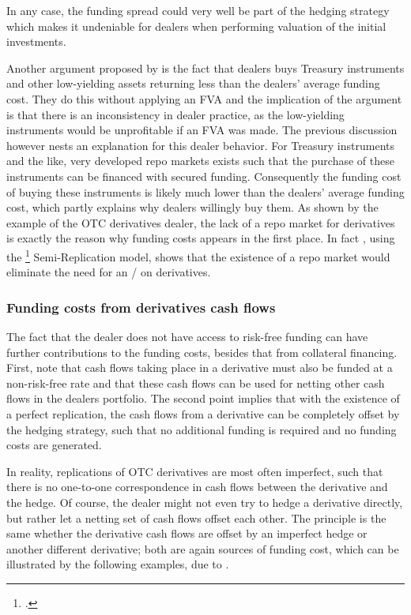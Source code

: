 \documentclass[../../../main.tex]{subfiles}
\begin{document}
        In any case,
        the funding spread could very well be part of the hedging strategy which makes it undeniable for dealers when performing valuation of the initial investments.

        Another argument proposed by \cite{HullWhite2012FVA} is the fact that dealers buys Treasury instruments and other low-yielding assets returning less than the dealers' average funding cost.
        They do this without applying an FVA and the implication of the argument is that there is an inconsistency in dealer practice,
        as the low-yielding instruments would be unprofitable if an FVA was made.
        The previous discussion however nests an explanation for this dealer behavior.
        For Treasury instruments and the like,
        very developed repo markets exists such that the purchase of these instruments can be financed with secured funding.
        Consequently the funding cost of buying these instruments is likely much lower than the dealers' average funding cost,
        which partly explains why dealers willingly buy them.
        As shown by the example of the OTC derivatives dealer, 
        the lack of a repo market for derivatives is exactly the reason why funding costs appears in the first place.
        In fact \cite[Section~9.4.1]{Green2015XVA}, 
        using the \footcite{BurgardKjaer2013Funding} Semi-Replication model,
        shows that the existence of a repo market would eliminate the need for an \FVA/ on derivatives. 
        
    \subsubsection{Funding costs from derivatives cash flows}
        The fact that the dealer does not have access to risk-free funding
        can have further contributions to the funding costs, besides that from collateral financing.
        First, note that cash flows taking place in a derivative must also be funded at a non-risk-free rate
        and that these cash flows can be used for netting other cash flows in the dealers portfolio.
        The second point implies that with the existence of a perfect replication,
        the cash flows from a derivative can be completely offset by the hedging strategy,
        such that no additional funding is required and no funding costs are generated.

        In reality, replications of OTC derivatives are most often imperfect,
        such that there is no one-to-one correspondence in cash flows between the derivative and the hedge.
        Of course, the dealer might not even try to hedge a derivative directly,
        but rather let a netting set of cash flows offset each other. 
        The principle is the same whether the derivative cash flows are offset by an imperfect hedge
        or another different derivative;
        both are again sources of funding cost, which can be illustrated by the following examples,
        due to \cite[Section~12.3]{Ruiz2015XVA}.
\end{document}
